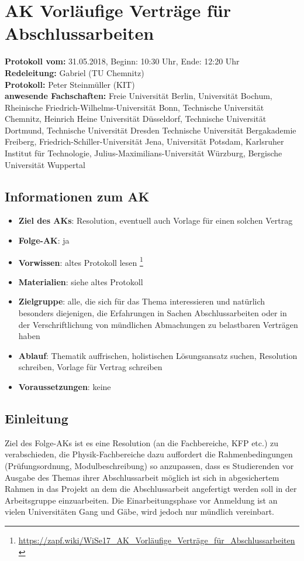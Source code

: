 
\section{AK Vorläufige Verträge für Abschlussarbeiten}

	\textbf{Protokoll vom:} 31.05.2018,
	Beginn: 10:30 Uhr,
	Ende: 12:20 Uhr \\
	\textbf{Redeleitung:} Gabriel (TU Chemnitz) \\
	\textbf{Protokoll:} Peter Steinmüller (KIT) \\
	\textbf{anwesende Fachschaften:} Freie Universität Berlin, Universität Bochum, Rheinische Friedrich-Wilhelms-Universität Bonn, Technische Universität Chemnitz, Heinrich Heine Universität Düsseldorf, Technische Universität Dortmund, Technische Universität Dresden Technische Universität Bergakademie Freiberg, Friedrich-Schiller-Universität Jena, Universität Potsdam, Karlsruher Institut für Technologie, Julius-Maximilians-Universität Würzburg, Bergische Universität Wuppertal

	\subsection*{Informationen zum AK}
		\begin{itemize}
			\item \textbf{Ziel des AKs}: Resolution, eventuell auch Vorlage für einen solchen Vertrag
			\item \textbf{Folge-AK}: ja
			\item \textbf{Vorwissen}: altes Protokoll lesen \footnote{\url{https://zapf.wiki/WiSe17_AK_Vorläufige_Verträge_für_Abschlussarbeiten}}
      \item \textbf{Materialien}: siehe altes Protokoll
			\item \textbf{Zielgruppe}: alle, die sich für das Thema interessieren und natürlich besonders diejenigen, die Erfahrungen in Sachen Abschlussarbeiten oder in der Verschriftlichung von mündlichen Abmachungen zu belastbaren Verträgen haben
			\item \textbf{Ablauf}: Thematik auffrischen, holistischen Lösungsansatz suchen, Resolution schreiben, Vorlage für Vertrag schreiben
			\item \textbf{Voraussetzungen}: keine
		\end{itemize}

  \subsection*{Einleitung}
  	Ziel des Folge-AKs ist es eine Resolution (an die Fachbereiche, KFP etc.) zu verabschieden, die Physik-Fachbereiche dazu auffordert die Rahmenbedingungen (Prüfungsordnung, Modulbeschreibung) so anzupassen, dass es Studierenden vor Ausgabe des Themas ihrer Abschlussarbeit möglich ist sich in abgesichertem Rahmen in das Projekt an dem die Abschlussarbeit angefertigt werden soll in der Arbeitsgruppe einzuarbeiten. Die Einarbeitungsphase vor Anmeldung ist an vielen Universitäten Gang und Gäbe, wird jedoch nur mündlich vereinbart.

